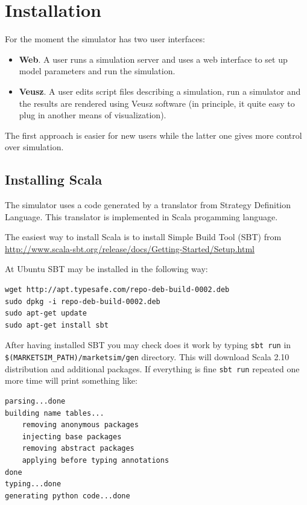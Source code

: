 \documentclass[a4paper,11pt]{article}
\begin{document}
\section{Installation}\label{installation}

For the moment the simulator has two user interfaces:

\begin{itemize}
\itemsep1pt\parskip0pt
\item
  \textbf{Web}. A user runs a simulation server and uses a web interface
  to set up model parameters and run the simulation.
\item
  \textbf{Veusz}. A user edits script files describing a simulation, run
  a simulator and the results are rendered using Veusz software (in
  principle, it quite easy to plug in another means of visualization).
\end{itemize}

The first approach is easier for new users while the latter one gives
more control over simulation.

\subsection{Installing Scala}\label{installing-scala}

The simulator uses a code generated by a translator from Strategy
Definition Language. This translator is implemented in Scala progamming
language. 

The easiest way to install Scala is to install Simple Build Tool (SBT)
from
\url{http://www.scala-sbt.org/release/docs/Getting-Started/Setup.html}

At Ubuntu SBT may be installed in the following way:

\begin{verbatim}
wget http://apt.typesafe.com/repo-deb-build-0002.deb
sudo dpkg -i repo-deb-build-0002.deb
sudo apt-get update
sudo apt-get install sbt
\end{verbatim}

After having installed SBT you may check does it work by typing
\texttt{sbt run} in \texttt{\$(MARKETSIM\_PATH)/marketsim/gen}
directory. This will download Scala 2.10 distribution and additional
packages. If everything is fine \texttt{sbt run} repeated one more time
will print something like:

\begin{verbatim}
parsing...done
building name tables...
    removing anonymous packages
    injecting base packages
    removing abstract packages
    applying before typing annotations
done
typing...done
generating python code...done
\end{verbatim}
\end{document}
